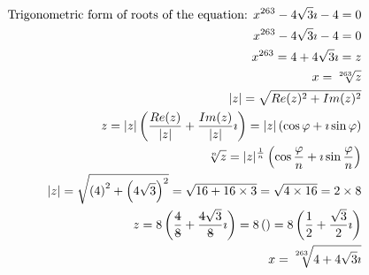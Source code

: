 \documentclass{article}
\newcommand{\stkout}[1]{\ifmmode\text{\sout{\ensuremath{#1}}}\else\sout{#1}\fi}
\begin{document}
    \begin{align*}
        \text{Trigonometric form of roots of the equation: } x ^ {263} - 4\sqrt3\imath -4 = 0\\
            x ^ {263} - 4\sqrt3\imath -4 = 0\\
            x ^ {263} = 4 + 4\sqrt3\imath = z\\
            x = \sqrt[263]{z}\\
            |z| = \sqrt{Re(z) ^ 2 + Im(z) ^ 2}\\
            z  = |z|\left(\frac{ Re(z) }{|z|} + \frac{Im(z)}{|z|}\imath\right) = |z|\left(\cos\varphi + \imath\sin\varphi\right)\\
            \sqrt[n]{z}  = |z| ^ \frac{1}{n}\left(\cos{\frac{\varphi}{n}} + \imath\sin{\frac{\varphi}{n}}\right)\\
            |z| = \sqrt{\left(4\right)^2 + \left(4\sqrt3\right) ^ 2}
            = \sqrt{16 + 16 \times 3}
            = \sqrt{4 \times 16} = 2 \times 8\\
            z = 8\left(\frac{\stkout{4}}{\stkout{8}} + \frac{\stkout{4}\sqrt3}{\stkout{8}}\imath\right) = 8\left(\right)
            = 8\left(\frac{1}{2} + \frac{\sqrt3}{2}\imath\right)\\
            x = \sqrt[263]{4 + 4\sqrt3\imath}\\
    \end{align*}
\end{document}
